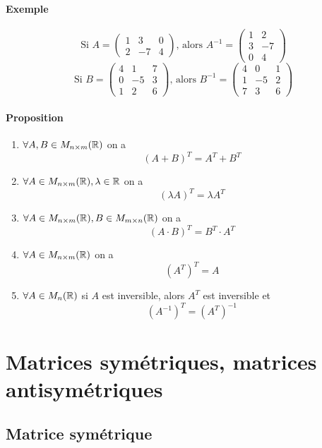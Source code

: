 \paragraph{Exemple}
$$\text{Si } A = \begin{pmatrix} 1 & 3 & 0 \\ 2 & -7 & 4 \end{pmatrix} 
  \text{, alors } A^{-1} = \begin{pmatrix} 1 & 2 \\ 3 & -7 \\ 0 & 4 \end{pmatrix}$$
$$\text{Si } B = \begin{pmatrix} 4 & 1 & 7 \\ 0 & -5 & 3 \\ 1 & 2 & 6 \end{pmatrix} 
  \text{, alors } B^{-1} = \begin{pmatrix} 4 & 0 & 1 \\ 1 & -5 & 2 \\ 7 & 3 & 6 \end{pmatrix}$$

\paragraph*{Proposition}
\begin{enumerate}[1)]
  \item $\forall A, B \in M_{n\times m}(\mathbb{R})$ on a
    $$(A + B)^{T} = A^{T} + B^{T}$$
  \item $\forall A \in M_{n\times m}(\mathbb{R}), \lambda \in \mathbb{R}$ on a
    $$(\lambda A)^{T} = \lambda A^{T}$$
  \item $\forall A \in M_{n\times m}(\mathbb{R}), B \in M_{m\times n}(\mathbb{R})$ on a
    $$(A \cdot B)^{T} = B^{T} \cdot A^{T}$$
  \item $\forall A \in M_{n\times m}(\mathbb{R})$ on a
    $$(A^{T})^{T} = A$$
  \item $\forall A \in M_{n}(\mathbb{R})$ si $A$ est inversible, alors $A^{T}$ est inversible et 
    $$(A^{-1})^{T} = (A^{T})^{-1}$$
\end{enumerate}

%
%
\section{Matrices symétriques, matrices antisymétriques}
%
%
%
\subsection{Matrice symétrique}
%
